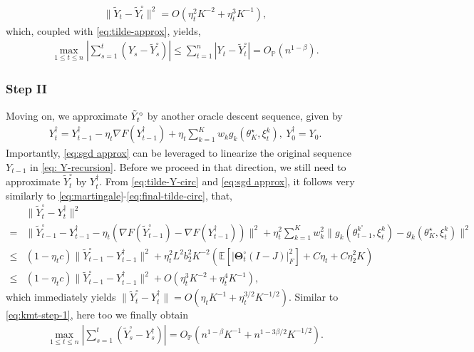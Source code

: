 \documentclass[a4paper,11pt]{article}
\numberwithin{equation}{section}
\theoremstyle{plain}
\theoremstyle{remark}
\def\IE{\mathbb{E}}
\def\bT{\mathbf{\Theta}}
\newcommand{\minparam}{\theta^\star_K}
\newcommand{\IP}{\mathbb{P}}
\begin{document}
\begin{align*}
    \|\tilde{Y}_t-\tilde{Y}_t^\circ\|^2 = O(\eta_t^2 K^{-2} + \eta_t^3 K^{-1}),
\end{align*}
which, coupled with \eqref{eq:tilde-approx}, yields,
\begin{align}
    \max_{1\leq t\leq n}|\sum_{s=1}^t(Y_s-\tilde{Y}_s^\circ)|\leq \sum_{t=1}^n |Y_t-\tilde{Y}_t^\circ|=O_{\IP}(n^{1-\beta}).  \label{eq:kmt-step-1}
\end{align}

\subsubsection{Step II}
Moving on, we approximate $\Tilde{Y}_t^{\circ}$ by another oracle descent sequence, given by
\begin{align}
    Y_t^{\dagger} = Y_{t-1}^\dagger - \eta_t \nabla F(Y_{t-1}^\dagger) + \eta_t \sum_{k=1}^K w_k g_k (\minparam, \xi_t^k), \ Y_0^\dagger=Y_0. \label{eq:sgd approx}
\end{align}
Importantly, \eqref{eq:sgd approx} can be leveraged to linearize the original sequence $Y_{t-1}$ in \eqref{eq: Y-recursion}. Before we proceed in that direction, we still need to approximate $\tilde{Y}_t^\circ$ by $Y_t^\dagger$. From \eqref{eq:tilde-Y-circ} and \eqref{eq:sgd approx}, it follows very similarly to \eqref{eq:martingale}-\eqref{eq:final-tilde-circ}, that,
\begin{align}
    &\|\tilde{Y}_t^\circ - Y_t^\dagger\|^2 \nonumber\\
    =&\| \tilde{Y}_{t-1}^\circ-{Y}_{t-1}^\dagger - \eta_t( \nabla F(\tilde{Y}_{t-1}^\circ) - \nabla F({Y}_{t-1}^\dagger))\|^2 + \eta_t^2 \sum_{k=1}^Kw_k^2\|g_k(\theta_{t-1}^{k^\circ}, \xi_t^k)-g_k(\minparam, \xi_t^k) \|^2 \nonumber\\
    \leq & (1 - \eta_t c) \|\tilde{Y}_{t-1}^\circ - {Y}_{t-1}^\dagger\|^2 + \eta_t^2 L^2 b_2^2 K^{-2} (\IE[|\bT_t^\circ(I-J)|_F^2] + C\eta_t + C\eta_2^2 K) \nonumber\\
    \leq & (1 - \eta_t c) \|\tilde{Y}_{t-1}^\circ - {Y}_{t-1}^\dagger\|^2 + O(\eta_t^3 K^{-2}+ \eta_t^4 K^{-1}), \nonumber
\end{align}
which immediately yields $\|\tilde{Y}_t^{\circ} - Y_t^\dagger \|= O(\eta_t K^{-1}+ \eta_t^{3/2}K^{-1/2})$. Similar to \eqref{eq:kmt-step-1}, here too we finally obtain
\begin{align}
     \max_{1\leq t\leq n}|\sum_{s=1}^t(\tilde{Y}_s^\circ- Y_s^\dagger)|=O_{\IP}(n^{1-\beta}K^{-1} + n^{1-3\beta/2}K^{-1/2}). \label{eq:kmt-step-2}
\end{align}
\end{document}
